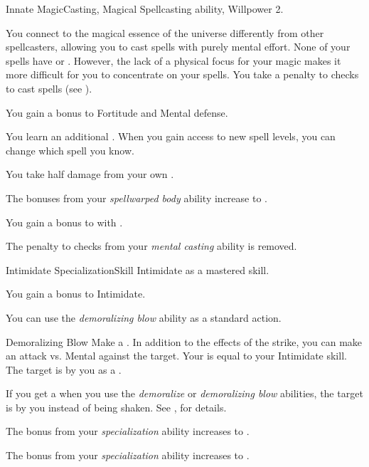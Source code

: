     \begin{feat}{Innate Magic}{Casting, Magical}
        \featpre Spellcasting ability, Willpower 2.

         You connect to the magical essence of the universe differently from other spellcasters, allowing you to cast spells with purely mental effort.
        None of your spells have  or .
        However, the lack of a physical focus for your magic makes it more difficult for you to concentrate on your spells.
        You take a  penalty to  checks to cast spells (see ).

         You gain a  bonus to Fortitude and Mental defense.

         You learn an additional .
        When you gain access to new spell levels, you can change which spell you know.

         You take half damage from your own .

         The bonuses from your \textit{spellwarped body} ability increase to .

         You gain a  bonus to  with .

         The penalty to  checks from your \textit{mental casting} ability is removed.
    \end{feat}

    \begin{feat}{Intimidate Specialization}{Skill}
        \featpre Intimidate as a mastered skill.

         You gain a  bonus to Intimidate.

         You can use the \textit{demoralizing blow} ability as a standard action.
        \begin{apability}{Demoralizing Blow}
            Make a .
            In addition to the effects of the strike, you can make an attack vs. Mental against the target.
            Your  is equal to your Intimidate skill.
            \hit The target is \shaken by you as a .
        \end{apability}

         If you get a  when you use the \textit{demoralize} or \textit{demoralizing blow} abilities, the target is \frightened by you instead of being shaken.
        See , for details.

         The bonus from your \textit{specialization} ability increases to .

         The bonus from your \textit{specialization} ability increases to .
    \end{feat}

